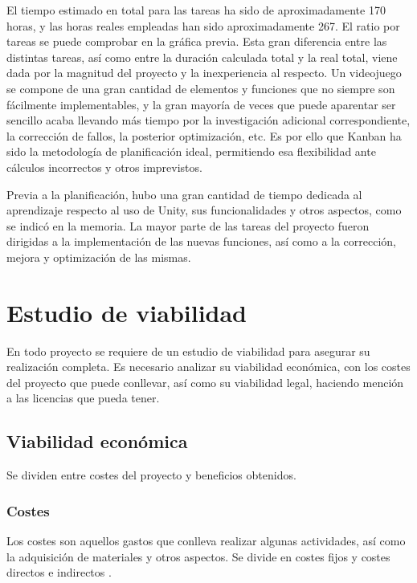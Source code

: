 
El tiempo estimado en total para las tareas ha sido de aproximadamente 170 horas, y las horas reales empleadas han sido aproximadamente 267. El ratio por tareas se puede comprobar en la gráfica previa. Esta gran diferencia entre las distintas tareas, así como entre la duración calculada total y la real total, viene dada por la magnitud del proyecto y la inexperiencia al respecto. Un videojuego se compone de una gran cantidad de elementos y funciones que no siempre son fácilmente implementables, y la gran mayoría de veces que puede aparentar ser sencillo acaba llevando más tiempo por la investigación adicional correspondiente, la corrección de fallos, la posterior optimización, etc. Es por ello que Kanban ha sido la metodología de planificación ideal, permitiendo esa flexibilidad ante cálculos incorrectos y otros imprevistos.

Previa a la planificación, hubo una gran cantidad de tiempo dedicada al aprendizaje respecto al uso de Unity, sus funcionalidades y otros aspectos, como se indicó en la memoria. La mayor parte de las tareas del proyecto fueron dirigidas a la implementación de las nuevas funciones, así como a la corrección, mejora y optimización de las mismas.

\section{Estudio de viabilidad}

En todo proyecto se requiere de un estudio de viabilidad para asegurar su realización completa. Es necesario analizar su viabilidad económica, con los costes del proyecto que puede conllevar, así como su viabilidad legal, haciendo mención a las licencias que pueda tener.

\subsection{Viabilidad económica}

Se dividen entre costes del proyecto y beneficios obtenidos.

\subsubsection{Costes}

Los costes son aquellos gastos que conlleva realizar algunas actividades, así como la adquisición de materiales y otros aspectos. Se divide en costes fijos y costes directos e indirectos \cite{costes}.

